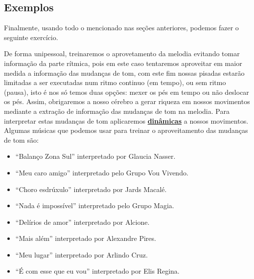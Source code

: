 \subsection{Exemplos} 

Finalmente, usando todo o mencionado nas seções anteriores, podemos fazer o seguinte exercício.
\begin{example} De forma unipessoal, 
treinaremos o aprovetamento da melodia evitando tomar informação da parte rítmica, 
pois em este caso tentaremos aproveitar em maior medida a informação das mudanças de tom,
com este fim nossas pisadas estarão limitadas a ser executadas num ritmo continuo (em tempo),
ou sem ritmo (pausa), 
isto é nos só temos duas opções: mexer os pés em tempo ou não deslocar os pés. 
Assim, obrigaremos a nosso cérebro a gerar riqueza em nossos movimentos mediante a extração de informação das 
mudanças de tom na melodia.
Para interpretar estas mudanças de tom aplicaremos 
\hyperref[sec:musicalidade:dinamicas]{\textbf{dinâmicas}} a nossos movimentos.
Algumas músicas que podemos usar para treinar o aproveitamento das mudanças de tom são:
\begin{itemize}
\item ``Balanço Zona Sul'' interpretado por Glaucia Nasser.
\item ``Meu caro amigo'' interpretado pelo Grupo Vou Vivendo.
\item ``Choro esdrúxulo'' interpretado por Jards Macalé.
\item ``Nada é impossível'' interpretado pelo Grupo Magia.
\item ``Delírios de amor'' interpretado por Alcione.
\item ``Mais além'' interpretado por Alexandre Pires.
\item ``Meu lugar'' interpretado por Arlindo Cruz.
\item ``É com esse que eu vou'' interpretado por Elis Regina.
\end{itemize} 
\end{example}
